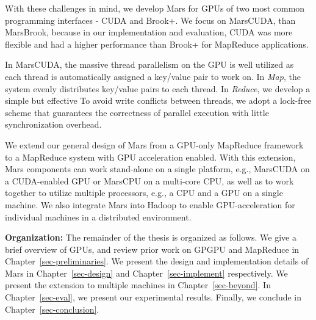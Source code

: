 With these challenges in mind, we develop Mars for GPUs of two most
common programming interfaces - CUDA and Brook+. We focus on
MarsCUDA, than MarsBrook, because in our implementation
and evaluation, CUDA was more flexible and had a higher performance than Brook+
for MapReduce applications.

In MarsCUDA, the massive thread parallelism on the GPU is well utilized
as each thread is automatically assigned a key/value pair to work on.
In {\em Map}, the system evenly distributes key/value
pairs to each thread. In {\em Reduce}, we develop a simple but effective
To avoid write conflicts between
threads, we adopt a lock-free scheme that guarantees the
correctness of parallel execution with little synchronization
overhead. 

We extend our general design of Mars from a GPU-only MapReduce framework to a MapReduce system with GPU acceleration enabled. With this extension, Mars components can work stand-alone on a single platform, e.g., MarsCUDA on a CUDA-enabled GPU or MarsCPU on a multi-core CPU, as well as to work together to utilize multiple processors, e.g., a CPU and a GPU on a single machine.
We also integrate Mars into Hadoop to enable GPU-acceleration for individual machines in a distributed environment.


\textbf{Organization:} The remainder of the thesis is organized as
follows. We give a brief overview of GPUs, and review prior work on GPGPU and
MapReduce in Chapter~\ref{sec-preliminaries}. We present the design
and implementation details of Mars in Chapter~\ref{sec-design} and
Chapter~\ref{sec-implement} respectively. We present the extension
to multiple machines in
Chapter~\ref{sec-beyond}. In Chapter~\ref{sec-eval}, we present our
experimental results. Finally, we conclude in Chapter~\ref{sec-conclusion}.

\newpage
